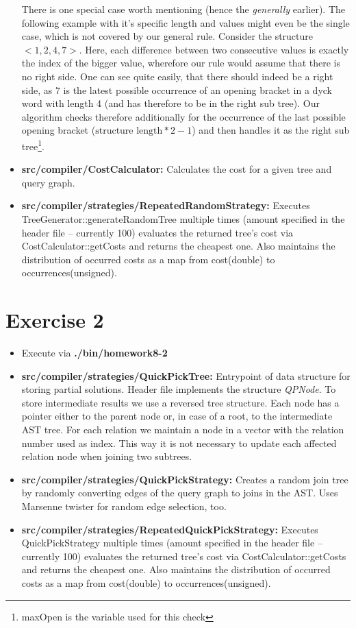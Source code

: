 \documentclass[paper=a4, fontsize=11pt]{scrartcl} %
\numberwithin{equation}{section} %
\numberwithin{figure}{section} %
\numberwithin{table}{section} %
\begin{document}
\begin{itemize}
		There is one special case worth mentioning (hence the \textit{generally} earlier). The following example with it's specific length and values might even be the single case, which is not covered by our general rule. Consider the structure $<1,2,4,7>$. Here, each difference between two consecutive values is exactly the index of the bigger value, wherefore our rule would assume that there is no right side. One can see quite easily, that there should indeed be a right side, as $7$ is the latest possible occurrence of an opening bracket in a dyck word with length 4 (and has therefore to be in the right sub tree). Our algorithm checks therefore additionally for the occurrence of the last possible opening bracket ($\text{structure length}*2-1$) and then handles it as the right sub tree\footnote{maxOpen is the variable used for this check}.  
		\item \textbf{src/compiler/CostCalculator:} Calculates the cost for a given tree and query graph.
		\item \textbf{src/compiler/strategies/RepeatedRandomStrategy:} Executes TreeGenerator::generateRandomTree multiple times (amount specified in the header file -- currently 100) evaluates the returned tree's cost via CostCalculator::getCosts and returns the cheapest one. Also maintains the distribution of occurred costs as a map from cost(double) to occurrences(unsigned).
	\end{itemize}

\section{Exercise 2}
	\begin{itemize}
		\item Execute via \textbf{./bin/homework8-2}
		\item \textbf{src/compiler/strategies/QuickPickTree:} Entrypoint of data structure for storing partial solutions. Header file implements the structure \textit{QPNode}. To store intermediate results we use a reversed tree structure. Each node has a pointer either to the parent node or, in case of a root, to the intermediate AST tree. For each relation we maintain a node in a vector with the relation number used as index. This way it is not necessary to update each affected relation node when joining two subtrees.
		\item \textbf{src/compiler/strategies/QuickPickStrategy:} Creates a random join tree by randomly converting edges of the query graph to joins in the AST. Uses Marsenne twister for random edge selection, too. 
		\item \textbf{src/compiler/strategies/RepeatedQuickPickStrategy:} Executes QuickPickStrategy multiple times (amount specified in the header file -- currently 100) evaluates the returned tree's cost via CostCalculator::getCosts and returns the cheapest one. Also maintains the distribution of occurred costs as a map from cost(double) to occurrences(unsigned).

	\end{itemize}
\end{document}
